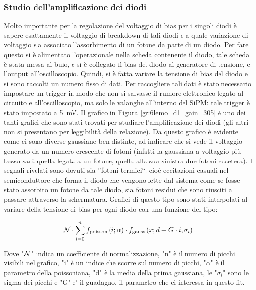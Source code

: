 \subsubsection{Studio dell'amplificazione dei diodi}
Molto importante per la regolazione del voltaggio di bias per i singoli diodi è sapere esattamente il voltaggio di breakdown di tali diodi e a quale variazione di
voltaggio sia associato l'assorbimento di un fotone da parte di un diodo. Per fare questo si è alimentato l'operazionale nella scheda contenente il diodo, tale
scheda è stata messa al buio, e si è collegato il bias del diodo al generatore di tensione, e l'output all'oscilloscopio. Quindi, si è fatta variare la tensione
di bias del diodo e si sono raccolti un numero fisso di dati. Per raccogliere tali dati è stato necessario impostare un trigger in modo che non si salvasse il rumore elettronico legato al circuito e all'oscilloscopio, ma solo le valanghe all'interno del SiPM: tale trigger è stato impostato a \SI{5}{\mV}.
Il grafico in Figura \ref{gr:6lemo_d1_gain_305} è uno dei tanti grafici che sono stati
trovati per studiare l'amplificazione dei diodi (gli altri non si presentano per leggibilità della relazione). Da questo grafico è evidente come ci sono diverse gaussiane ben distinte, ad indicare che si vede il voltaggio
generato da un numero crescente di fotoni (infatti la gaussiana a voltaggio più basso sarà quella legata a un fotone, quella alla sua sinistra due fotoni eccetera).
I segnali rivelati sono dovuti sia ''fotoni termici``, cioè eccitazioni casuali nel semiconduttore che forma il diodo che vengono lette dal sistema come se fosse stato assorbito un fotone
da tale diodo, sia fotoni residui che sono riusciti a passare attraverso la schermatura. Grafici di questo tipo sono stati interpolati al variare della tensione di bias per ogni diodo con una funzione del tipo:

\begin{equation}
	{\cal N}\cdot\sum_{i=0}^{n}f_{\mathrm{poisson}}\left(i;\alpha\right)\cdot f_{\mathrm{gauss}}\left(x; d + G\cdot i, \sigma_i\right)
	\label{eq:segnale_buio}
\end{equation}

Dove "${\cal N}$" indica un coefficiente di normalizzazione, "n" \`e il numero di picchi visibili nel grafico, "i" \`e un indice che scorre sul numero di picchi, "$\alpha$" \`e il parametro della poissoniana, "d" \`e la media della prima gaussiana, le "$\sigma_i$" sono le sigma dei picchi e "G" e' il guadagno, il parametro che ci interessa in questo fit.

